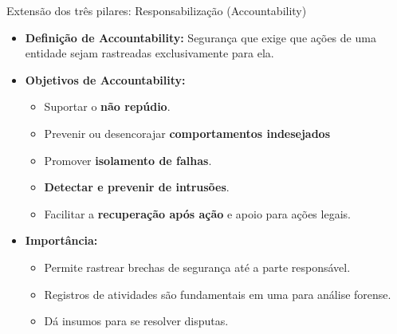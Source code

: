 \begin{frame}{Extensão dos três pilares: Responsabilização (Accountability)}

    \begin{itemize}
        \item \textbf{Definição de Accountability:} Segurança que exige que ações de uma entidade sejam rastreadas exclusivamente para ela.
        \item \textbf{Objetivos de Accountability:}
              \begin{itemize}
                  \item Suportar o \textbf{não repúdio}.
                  \item Prevenir ou desencorajar \textbf{comportamentos indesejados}
                  \item Promover  \textbf{isolamento de falhas}.
                  \item \textbf{Detectar e prevenir de intrusões}.
                  \item Facilitar a \textbf{recuperação após ação} e apoio para ações legais.
              \end{itemize}
        \item \textbf{Importância:}
              \begin{itemize}
                  \item Permite rastrear brechas de segurança até a parte responsável.
                  \item Registros de atividades são fundamentais em uma para análise forense.
                  \item Dá insumos para se resolver disputas.
              \end{itemize}
    \end{itemize}

\end{frame}

